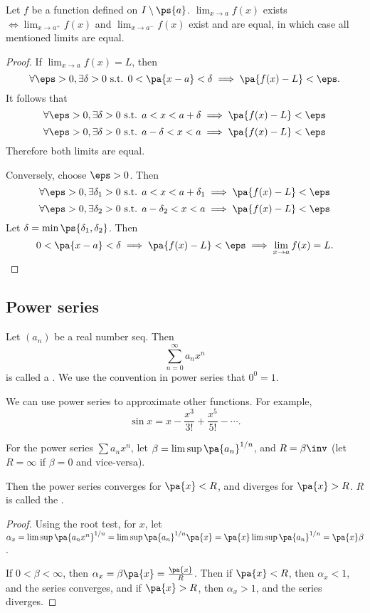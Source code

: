 \documentclass[11pt]{scrartcl}
\numberwithin{equation}{section}
\begin{document}
\begin{theorem}
    Let $f$ be a function defined on $I\setminus\ps{a}$. 
    $\lim_{x\rightarrow a}f(x)$ exists $\iff \lim_{x\rightarrow a^+}f(x)$
    and $\lim_{x\rightarrow a^-}f(x)$ exist and are equal, in 
    which case all mentioned limits are equal.
\end{theorem}
\begin{proof}
    If $\lim_{x\rightarrow a}f(x)=L$, then 
    \[\forall\eps>0, \exists\delta>0 \text{ s.t. } 0<\pa{x-a}<\delta\implies \pa{f(x)-L}<\eps.\]
    It follows that 
    \[ \forall\eps>0, \exists\delta>0 \text{ s.t. } a<x<a+\delta\implies \pa{f(x)-L}<\eps\]
    \[ \forall\eps>0, \exists\delta>0 \text{ s.t. } a-\delta<x<a\implies \pa{f(x)-L}<\eps\]
    Therefore both limits are equal.

    Conversely, choose $\eps>0$. Then 
    \[ \forall\eps>0, \exists\delta_1>0 \text{ s.t. } a<x<a+\delta_1\implies \pa{f(x)-L}<\eps\]
    \[ \forall\eps>0, \exists\delta_2>0 \text{ s.t. } a-\delta_2<x<a\implies \pa{f(x)-L}<\eps\]
    Let $\delta=\min\ps{\delta_1,\delta_2}$. Then 
    \[ 0<\pa{x-a}<\delta\implies \pa{f(x)-L}<\eps\implies \lim_{x\rightarrow a}f(x)=L.\qedhere\]
\end{proof}
\subsection{Power series}
\begin{definition}
    Let $(a_n)$ be a real number seq. Then 
    \[\sum_{n=0}^{\infty}a_nx^n \]    
    is called a . 
    We use the convention in power series that $0^0=1$.
\end{definition}
We can use power series to approximate other functions. For example,
\[\sin x = x-\frac{x^3}{3!}+\frac{x^5}{5!}-\cdots.\]

\begin{theorem}
    For the power series $\sum a_nx^n$, let $\beta=\limsup\pa{a_n}^{1/n}$,
    and $R=\beta\inv$ (let $R=\infty$ if $\beta=0$ and vice-versa).
    
    Then the power series converges for $\pa{x}<R$, and diverges for 
    $\pa{x}>R$. $R$ is called the .
\end{theorem}

\begin{proof}
    Using the root test, for $x$,
    let $\alpha_x=\limsup\pa{a_nx^n}^{1/n}=\limsup\pa{a_n}^{1/n}\pa{x}
    =\pa{x}\limsup\pa{a_n}^{1/n}=\pa{x}\beta$.

    If $0<\beta<\infty$, then $\alpha_x=\beta\pa{x}=\frac{\pa{x}}{R}$.
    Then if $\pa{x}<R$, then $\alpha_x<1$, and the series converges, and 
    if $\pa{x}>R$, then $\alpha_x>1$, and the series diverges.
\end{proof}
\end{document}
